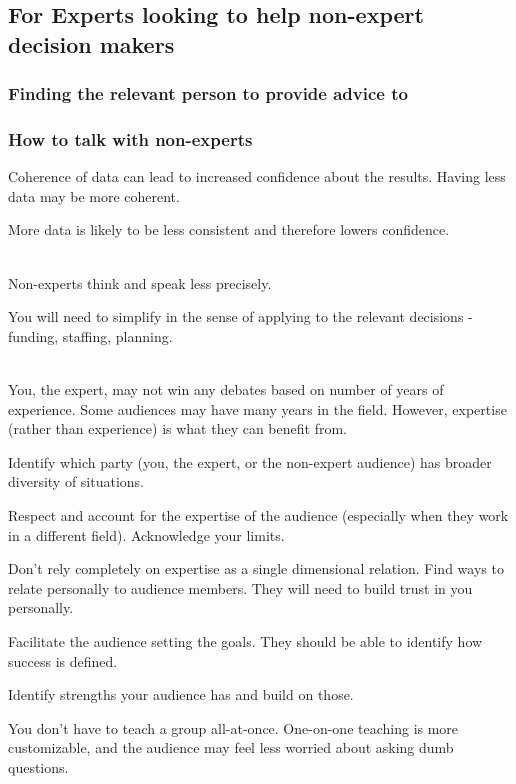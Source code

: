 \subsection*{For Experts looking to help non-expert decision makers}


\subsubsection*{Finding the relevant person to provide advice to}



\subsubsection*{How to talk with non-experts}

Coherence of data can lead to increased confidence about the results.
Having less data may be more coherent. 

More data is likely to be less consistent and therefore lowers confidence.

\ \\

Non-experts think and speak less precisely.

You will need to simplify in the sense of applying to the relevant decisions - funding, staffing, planning.

\ \\

You, the expert, may not win any debates based on number of years of experience. Some audiences may have many years in the field. However, expertise (rather than experience) is what they can benefit from. 

Identify which party (you, the expert, or the non-expert audience) has broader diversity of situations.

Respect and account for the expertise of the audience (especially when they work in a different field). Acknowledge your  limits.

Don't rely completely on expertise as a single dimensional relation. Find ways to relate personally to audience members. They will need to build trust in you personally.

Facilitate the audience setting the goals. They should be able to identify how success is defined.

Identify strengths your audience has and build on those.

You don't have to teach a group all-at-once. One-on-one teaching is more customizable, and the audience may feel less worried about asking dumb questions.

